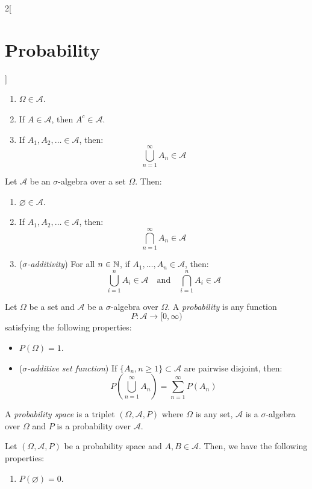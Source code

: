 \documentclass[../../../main.tex]{subfiles}
\begin{document}
\begin{multicols}{2}[\section{Probability}]
\begin{definition}
    \begin{enumerate}
      \item $\Omega\in\mathcal{A}$.
      \item If $A\in\mathcal{A}$, then $A^c\in\mathcal{A}$.
      \item If $A_1,A_2,\ldots\in\mathcal{A}$, then: $$\bigcup_{n=1}^\infty A_n\in\mathcal{A}$$
    \end{enumerate}
  \end{definition}
  \begin{prop}
    Let $\mathcal{A}$ be an $\sigma$-algebra over a set $\Omega$. Then:
    \begin{enumerate}
      \item $\varnothing\in\mathcal{A}$.
      \item If $A_1,A_2,\ldots\in\mathcal{A}$, then: $$\bigcap_{n=1}^\infty A_n\in\mathcal{A}$$
      \item (\textit{$\sigma$-additivity}) For all $n\in\mathbb{N}$, if $A_1,\ldots,A_n\in\mathcal{A}$, then: $$\bigcup_{i=1}^nA_i\in\mathcal{A}\quad\text{and}\quad\bigcap_{i=1}^nA_i\in\mathcal{A}$$
    \end{enumerate}
  \end{prop}
  \begin{definition}
    Let $\Omega$ be a set and $\mathcal{A}$ be a $\sigma$-algebra over $\Omega$. A \textit{probability} is any function $$P:\mathcal{A}\longrightarrow[0,\infty)$$ satisfying the following properties:
    \begin{itemize}
      \item $P(\Omega)=1$.
      \item (\textit{$\sigma$-additive set function}) If $\{A_n,n\geq1\}\subset\mathcal{A}$ are pairwise disjoint, then: $$P\left(\bigcup_{n=1}^\infty A_n\right)=\sum_{n=1}^\infty P(A_n)$$
    \end{itemize}
  \end{definition}
  \begin{definition}
    A \textit{probability space} is a triplet $(\Omega,\mathcal{A},P)$ where $\Omega$ is any set, $\mathcal{A}$ is a $\sigma$-algebra over $\Omega$ and $P$ is a probability over $\mathcal{A}$.
  \end{definition}
  \begin{prop}
    Let $(\Omega,\mathcal{A},P)$ be a probability space and $A,B\in\mathcal{A}$. Then, we have the following properties:
    \begin{enumerate}
      \item $P(\varnothing)=0$.

\end{enumerate}
\end{prop}
\end{multicols}
\end{document}
